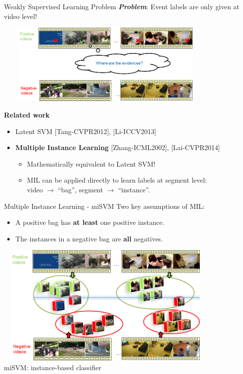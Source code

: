 \documentclass{beamer}
\begin{document}
\begin{frame}{Weakly Supervised Learning Problem} 	
	\textbf{\textit{Problem}}: Event labels are only given at video level!
	
	\begin{center}
		\includegraphics[width=11cm,height=4cm]{images/part4/supervidedlearning.png}
	\end{center}
	
	
	\textbf{Related work} 
	\begin{itemize}	
		\item Latent SVM [Tang-CVPR2012], [Li-ICCV2013]
		\item \textbf{Multiple Instance Learning} [Zhang-ICML2002], [Lai-CVPR2014] 
			\begin{itemize}	
\item Mathematically equivalent to Latent SVM! 
\item MIL can be applied directly to learn labels at segment level: \\
video $\rightarrow$ ``bag'', segment $\rightarrow$ ``instance''.
			\end{itemize}	
	\end{itemize}	

\end{frame}	

\begin{frame}{Multiple Instance Learning - miSVM} 	
	Two key assumptions of MIL:
	\begin{itemize}	
		\item A positive bag has \textbf{at least} one positive instance.
		\item The instances in a negative bag are \textbf{all} negatives.
	\end{itemize}	
	\begin{center}
		\includegraphics[width=11cm,height=6cm]{images/part4/miSVM.png}
		\\
		\scriptsize{miSVM: instance-based classifier}
	\end{center}
	
\end{frame}	
\end{document}
